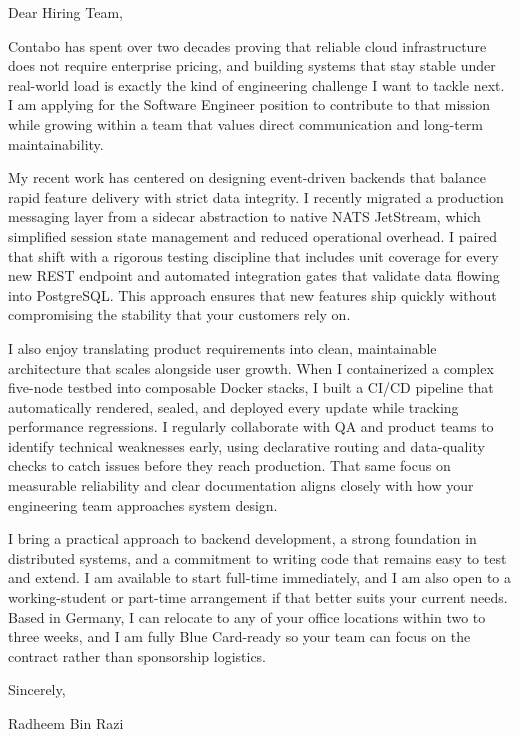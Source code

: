 \documentclass[11pt,a4paper]{coverletter}
\begin{document}

\opening{Dear Hiring Team,}

Contabo has spent over two decades proving that reliable cloud infrastructure does not require enterprise pricing, and building systems that stay stable under real-world load is exactly the kind of engineering challenge I want to tackle next. I am applying for the Software Engineer position to contribute to that mission while growing within a team that values direct communication and long-term maintainability.

My recent work has centered on designing event-driven backends that balance rapid feature delivery with strict data integrity. I recently migrated a production messaging layer from a sidecar abstraction to native NATS JetStream, which simplified session state management and reduced operational overhead. I paired that shift with a rigorous testing discipline that includes unit coverage for every new REST endpoint and automated integration gates that validate data flowing into PostgreSQL. This approach ensures that new features ship quickly without compromising the stability that your customers rely on.

I also enjoy translating product requirements into clean, maintainable architecture that scales alongside user growth. When I containerized a complex five-node testbed into composable Docker stacks, I built a CI/CD pipeline that automatically rendered, sealed, and deployed every update while tracking performance regressions. I regularly collaborate with QA and product teams to identify technical weaknesses early, using declarative routing and data-quality checks to catch issues before they reach production. That same focus on measurable reliability and clear documentation aligns closely with how your engineering team approaches system design.

I bring a practical approach to backend development, a strong foundation in distributed systems, and a commitment to writing code that remains easy to test and extend. I am available to start full-time immediately, and I am also open to a working-student or part-time arrangement if that better suits your current needs. Based in Germany, I can relocate to any of your office locations within two to three weeks, and I am fully Blue Card-ready so your team can focus on the contract rather than sponsorship logistics.

\closing{Sincerely,}{Radheem Bin Razi}
\end{document}
